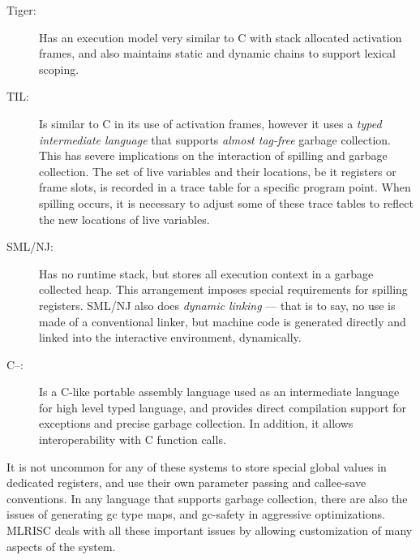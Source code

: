    \begin{description} 
      \item[Tiger:] Has an execution
      model very similar to C with stack allocated activation frames,
      and also maintains static and dynamic chains to support lexical
      scoping.

      \item[TIL:] Is similar to C in its
      use of activation frames, however it uses a 
      \emph{typed intermediate language} that 
       supports \emph{almost tag-free}
      garbage collection.  This has severe implications on the
      interaction of spilling and garbage collection. The set of live
      variables and their locations, be it registers or frame slots,
      is recorded in a trace table for a specific program point. When
      spilling occurs, it is necessary to adjust some of these trace
      tables to reflect the new locations of live variables.

      \item[SML/NJ:] Has no runtime
      stack, but stores all execution context in a garbage collected
      heap. This arrangement imposes special requirements for spilling
      registers. SML/NJ also does \emph{dynamic linking} --- that is
      to say, no use is made of a conventional linker, but machine
      code is generated directly and linked into the interactive
      environment, dynamically.
 
      \item[C--:] Is a C-like portable assembly
      language used as an intermediate language for high level typed language,
      and provides direct compilation support for exceptions and 
      precise garbage collection.  In addition, it allows 
      interoperability with C function calls.  
\end{description}

  It is not uncommon for any of these systems to store special global
  values in dedicated registers, and use their own parameter passing
  and callee-save conventions. In any language that supports garbage
  collection, there are also the issues of generating gc type maps,
  and gc-safety in aggressive optimizations.  MLRISC deals with all these
  important issues by allowing customization of many aspects of the system.
